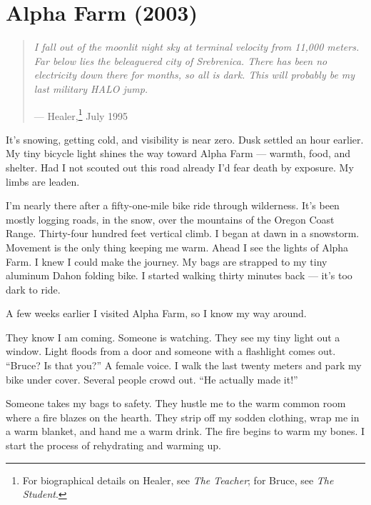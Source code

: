 

\chapter{Alpha Farm (2003)}
\label{t2:ch01:alpha-farm}
\label{pos02:alpha-farm}

\begin{quote}
\textit{I fall out of the moonlit night sky at terminal velocity from 11,000 meters. Far below lies the beleaguered city of Srebrenica. There has been no electricity down there for months, so all is dark. This will probably be my last military HALO jump.}

\hfill --- Healer,\footnote{For biographical details on Healer, see \textit{The Teacher}; for Bruce, see \textit{The Student}.} July 1995
\end{quote}

\vspace{0.5cm}

It's snowing, getting cold, and visibility is near zero. Dusk settled an hour earlier. My tiny bicycle light shines the way toward Alpha Farm --- warmth, food, and shelter. Had I not scouted out this road already I'd fear death by exposure. My limbs are leaden.

I'm nearly there after a fifty-one-mile bike ride through wilderness. It's been mostly logging roads, in the snow, over the mountains of the Oregon Coast Range. Thirty-four hundred feet vertical climb. I began at dawn in a snowstorm. Movement is the only thing keeping me warm. Ahead I see the lights of Alpha Farm. I knew I could make the journey. My bags are strapped to my tiny aluminum Dahon folding bike. I started walking thirty minutes back --- it's too dark to ride.

A few weeks earlier I visited Alpha Farm, so I know my way around.

They know I am coming. Someone is watching. They see my tiny light out a window. Light floods from a door and someone with a flashlight comes out. ``Bruce? Is that you?'' A female voice. I walk the last twenty meters and park my bike under cover. Several people crowd out. ``He actually made it!''

Someone takes my bags to safety. They hustle me to the warm common room where a fire blazes on the hearth. They strip off my sodden clothing, wrap me in a warm blanket, and hand me a warm drink. The fire begins to warm my bones. I start the process of rehydrating and warming up.

